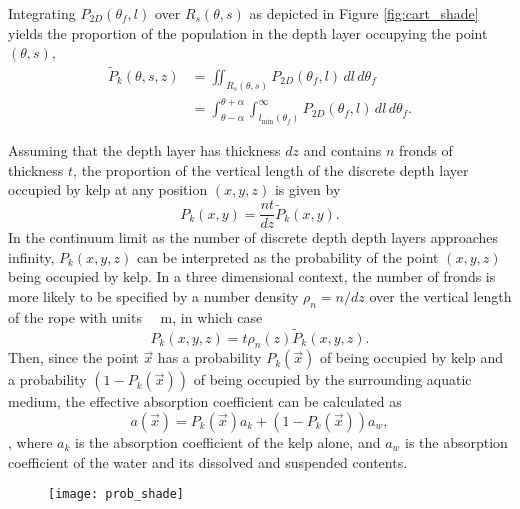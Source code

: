Integrating $P_{2D}(\theta_f,l)$ over $R_s(\theta,s)$ as depicted in Figure \ref{fig:cart_shade} yields the proportion of the population in the depth layer occupying the point $(\theta,s)$,
\begin{align*}
		\tilde{P}_k(\theta,s,z)	&= \iint_{R_s(\theta,s)}
								P_{2D}(\theta_f,l)
								\,dl\,d\theta_f \nonumber \\
							&= \int_{\theta-\alpha}^{\theta+\alpha}
								\int_{l_{\min}(\theta_f)}^\infty
								P_{2D}(\theta_f,l)
								\,dl\,d\theta_f.
\end{align*}

Assuming that the depth layer has thickness $dz$ and contains $n$ fronds of thickness $t$,
the proportion of the vertical length of the discrete depth layer occupied by kelp at any position $(x,y,z)$ is given by
\begin{equation*}
  P_k(x, y) = \frac{nt}{dz}\tilde{P}_k(x, y).
\end{equation*}
In the continuum limit as the number of discrete depth depth layers approaches infinity, $P_k(x,y,z)$ can be interpreted as the probability of the point $(x,y,z)$ being occupied by kelp.
In a three dimensional context, the number of fronds is more likely to be specified by a number density $\rho_n=n/dz$ over the vertical length of the rope with units \SI{}{\per\m}, in which case
\begin{equation*}
  P_k(x, y, z) = t \rho_n(z) \tilde{P}_k(x, y, z).
\end{equation*}
Then, since the point $\vec{x}$ has a probability $P_k(\vec{x})$ of being occupied by kelp and a probability $(1-P_k(\vec{x}))$ of being occupied by the surrounding aquatic medium,
the effective absorption coefficient can be calculated as
\begin{equation*}
  a(\vec{x}) = P_k(\vec{x})a_k + (1-P_k(\vec{x}))a_w,
\end{equation*},
where $a_k$ is the absorption coefficient of the kelp alone, and $a_w$ is the absorption coefficient of the water and its dissolved and suspended contents.

\begin{figure}[h]
	\centering
	\texttt{[image: prob\_shade]}
	\label{fig:prob_shade}
\end{figure}

